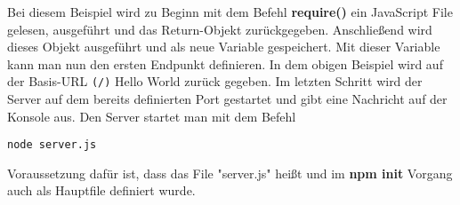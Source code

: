 Bei diesem Beispiel wird zu Beginn mit dem Befehl \textbf{require()} ein JavaScript File gelesen, ausgeführt und das Return-Objekt zurückgegeben. Anschließend wird dieses Objekt ausgeführt und als neue Variable gespeichert. Mit dieser Variable kann man nun den ersten Endpunkt definieren. In dem obigen Beispiel wird auf der Basis-URL \verb|(/)| Hello World zurück gegeben. Im letzten Schritt wird der Server auf dem bereits definierten Port gestartet und gibt eine Nachricht auf der Konsole aus. Den Server startet man mit dem Befehl
\begin{verbatim}
node server.js
\end{verbatim}
Voraussetzung dafür ist, dass das File "server.js" heißt und im \textbf{npm init} Vorgang auch als Hauptfile definiert wurde.
\newline
\cite{creating_basic_server}